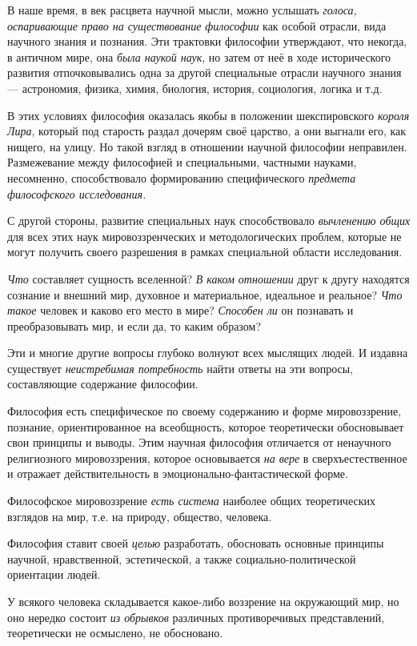 \documentclass[a4paper,14pt,russian]{extreport}
\begin{document}
В наше время, в век расцвета научной мысли, можно услышать \emph{голоса, оспаривающие право на существование философии} как особой отрасли, вида научного знания и познания. Эти трактовки философии утверждают, что некогда, в античном мире, она \emph{была наукой наук}, но затем от неё в ходе исторического развития отпочковывались одна за другой специальные отрасли научного знания --- астрономия, физика, химия, биология, история, социология, логика и т.д.

В этих условиях философия оказалась якобы в положении шекспировского \emph{короля Лира}, который под старость раздал дочерям своё царство, а они выгнали его, как нищего, на улицу. Но такой взгляд в отношении научной философии неправилен. Размежевание между философией и специальными, частными науками, несомненно, способствовало формированию специфического \emph{\emph{предмета философского исследования}.}

С другой стороны, развитие специальных наук способствовало \emph{вычленению общих} для всех этих наук мировоззренческих и методологических проблем, которые не могут получить своего разрешения в рамках специальной области исследования.

\emph{Что} составляет сущность вселенной? \emph{В каком отношении} друг к другу находятся сознание и внешний мир, духовное и материальное, идеальное и реальное? \emph{Что такое} человек и каково его место в мире? \emph{Способен ли} он познавать и преобразовывать мир, и если да, то каким образом?

Эти и многие другие вопросы глубоко волнуют всех мыслящих людей. И издавна существует \emph{неистребимая потребность} найти ответы на эти вопросы, составляющие содержание философии.

Философия есть специфическое по своему содержанию и форме мировоззрение, познание, ориентированное на всеобщность, которое теоретически обосновывает свои принципы и выводы. Этим научная философия отличается от ненаучного религиозного мировоззрения, которое основывается \emph{на вере} в сверхъестественное и отражает действительность в эмоционально-фантастической форме.

Философское мировоззрение \emph{есть система} наиболее общих теоретических взглядов на мир, т.е. на природу, общество, человека.

Философия ставит своей \emph{целью} разработать, обосновать основные принципы научной, нравственной, эстетической, а также социально-политической ориентации людей.

У всякого человека складывается какое-либо воззрение на окружающий мир, но оно нередко состоит \emph{из обрывков} различных противоречивых представлений, теоретически не осмыслено, не обосновано.
\end{document}
